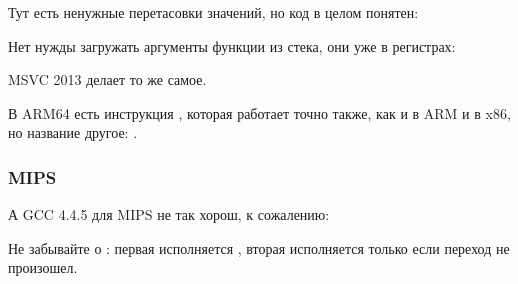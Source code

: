 

Тут есть ненужные перетасовки значений, но код в целом понятен:




Нет нужды загружать аргументы функции из стека, они уже в регистрах:



MSVC 2013 делает то же самое.

В ARM64 есть инструкция , которая работает точно также, как и  в ARM и  в x86,
но название другое: .



\subsubsection{MIPS}

А GCC 4.4.5 для MIPS не так хорош, к сожалению:



Не забывайте о : первая  исполняется  ,
вторая  исполняется только если переход не произошел.

